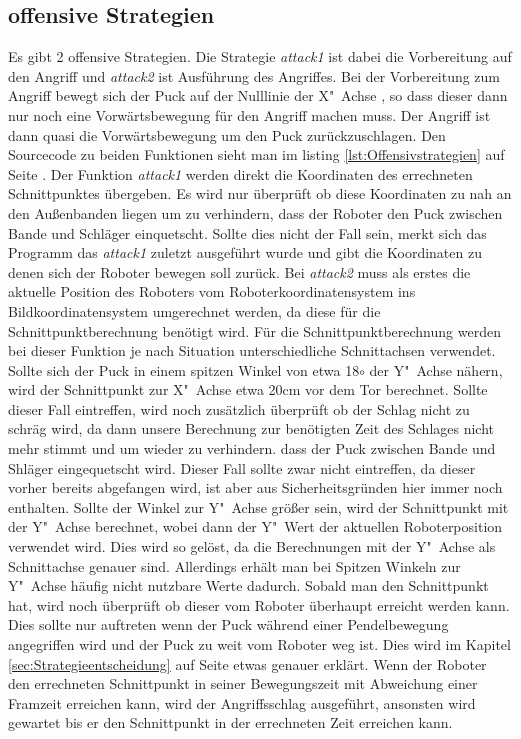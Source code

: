 \subsection{offensive Strategien}
Es gibt 2 offensive Strategien. Die Strategie \textit{attack1} ist dabei die Vorbereitung auf den Angriff und \textit{attack2} ist Ausführung des Angriffes. Bei der Vorbereitung zum Angriff bewegt sich der Puck auf der Nulllinie der X"~Achse , so dass dieser dann nur noch eine Vorwärtsbewegung für den Angriff machen muss. Der Angriff ist dann quasi die Vorwärtsbewegung um den Puck zurückzuschlagen.
Den Sourcecode zu beiden Funktionen sieht man im listing \ref{lst:Offensivstrategien} auf Seite \pageref{lst:Offensivstrategien}.
Der Funktion \textit{attack1} werden direkt die Koordinaten des errechneten Schnittpunktes übergeben. Es wird nur überprüft ob diese Koordinaten zu nah an den Außenbanden liegen um zu verhindern, dass der Roboter den Puck zwischen Bande und Schläger einquetscht. Sollte dies nicht der Fall sein, merkt sich das Programm das \textit{attack1} zuletzt ausgeführt wurde und gibt die Koordinaten zu denen sich der Roboter bewegen soll zurück.
Bei \textit{attack2} muss als erstes die aktuelle Position des Roboters vom Roboterkoordinatensystem ins Bildkoordinatensystem umgerechnet werden, da diese für die Schnittpunktberechnung benötigt wird. Für die Schnittpunktberechnung werden bei dieser Funktion je nach Situation unterschiedliche Schnittachsen verwendet. Sollte sich der Puck in einem spitzen Winkel von etwa 18$\circ$ der Y"~Achse nähern, wird der Schnittpunkt zur X"~Achse etwa 20cm vor dem Tor berechnet. Sollte dieser Fall eintreffen, wird noch zusätzlich überprüft ob der Schlag nicht zu schräg wird, da dann unsere Berechnung zur benötigten Zeit des Schlages nicht mehr stimmt und um wieder zu verhindern. dass der Puck zwischen Bande und Shläger eingequetscht wird. Dieser Fall sollte zwar nicht eintreffen, da dieser vorher bereits abgefangen wird, ist aber aus Sicherheitsgründen hier immer noch enthalten. Sollte der Winkel zur Y"~Achse größer sein, wird der Schnittpunkt mit der Y"~Achse berechnet, wobei dann der Y"~Wert der aktuellen Roboterposition verwendet wird. Dies wird so gelöst, da die Berechnungen mit der Y"~Achse als Schnittachse genauer sind. Allerdings erhält man bei Spitzen Winkeln zur Y"~Achse häufig nicht nutzbare Werte dadurch. Sobald man den Schnittpunkt hat, wird noch überprüft ob dieser vom Roboter überhaupt erreicht werden kann. Dies sollte nur auftreten wenn der Puck während einer Pendelbewegung angegriffen wird und der Puck zu weit vom Roboter weg ist. Dies wird im Kapitel \ref{sec:Strategieentscheidung} auf Seite \pageref{sec:Strategieentscheidung} etwas genauer erklärt. Wenn der Roboter den errechneten Schnittpunkt in seiner Bewegungszeit mit Abweichung einer Framzeit erreichen kann, wird der Angriffsschlag ausgeführt, ansonsten wird gewartet bis er den Schnittpunkt in der errechneten Zeit erreichen kann.
